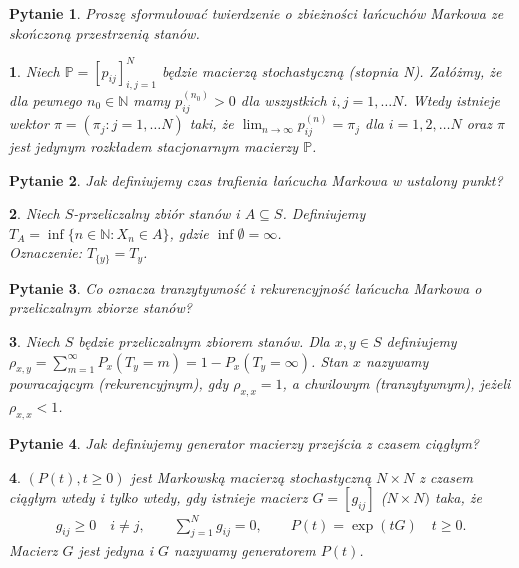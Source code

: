\documentclass[10pt]{mwart}
\theoremstyle{plain}
\newtheorem{pytanie}{Pytanie}
\theoremstyle{break}
\newtheorem*{odpowiedź}{}
\begin{document}
\begin{pytanie}
Proszę sformułować twierdzenie o zbieżności łańcuchów Markowa ze skończoną przestrzenią stanów.
\end{pytanie}
\begin{odpowiedź}
    Niech $\mathbb{P} = [p_{ij}]_{i,j=1}^N$
    będzie macierzą stochastyczną (stopnia  N).
    Załóżmy, że dla pewnego $n_0\in \mathbb{N}$
    mamy $p_{ij}^{(n_0)} > 0$ dla wszystkich $i, j=1, \ldots N$.
    Wtedy istnieje wektor $\pi = (\pi_j: j = 1, \ldots N)$
    taki, że $\lim_{n\to \infty}p^{(n)}_{ij} = \pi_j$ dla
    $i = 1, 2, \ldots N$ oraz $\pi$ jest jedynym rozkładem
    stacjonarnym macierzy $\mathbb{P}$.
\end{odpowiedź}


\begin{pytanie}
Jak definiujemy czas trafienia łańcucha Markowa w ustalony punkt?
\end{pytanie}
\begin{odpowiedź}
    Niech $S$-przeliczalny zbiór stanów i $A\subseteq S$.
    Definiujemy $T_A=\inf\{n\in \mathbb{N} : X_n\in A\}$,
    gdzie $\inf{\emptyset} = \infty$.\\
    Oznaczenie: $T_{\{y\}} = T_y$.
\end{odpowiedź}


\begin{pytanie}
Co oznacza tranzytywność i rekurencyjność łańcucha Markowa o przeliczalnym zbiorze stanów?
\end{pytanie}
\begin{odpowiedź}
    Niech $S$ będzie przeliczalnym zbiorem stanów.
    Dla $x, y \in S$ definiujemy
    $\rho_{x,y} = \sum_{m = 1}^\infty P_x(T_y = m) = 1 - P_x(T_y = \infty)$.
    Stan $x$ nazywamy powracającym (rekurencyjnym),
    gdy $\rho_{x,x} = 1$,
    a chwilowym (tranzytywnym), jeżeli $\rho_{x,x} < 1$.
\end{odpowiedź}


\begin{pytanie}
Jak definiujemy generator macierzy przejścia z czasem ciągłym?
\end{pytanie}
\begin{odpowiedź}
    $(P(t), t\geq 0)$ jest Markowską macierzą stochastyczną
    $N \times N$ z czasem ciągłym wtedy i tylko wtedy,
    gdy istnieje macierz $G= [g_{ij}]$ ($N\times N)$ taka, że
    \begin{gather}
        g_{ij} \geq 0 \quad i \neq j, \qquad
        \sum_{j=1}^N g_{ij} = 0, \qquad
        P(t)=\exp(tG) \quad t\geq 0.
    \end{gather}
    Macierz $G$ jest jedyna i $G$ nazywamy generatorem $P(t)$.
\end{odpowiedź}
\end{document}
